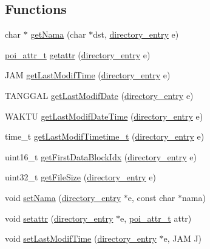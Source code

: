 \subsection*{Functions}
\begin{DoxyCompactItemize}
\item 
char $\ast$ \hyperlink{directory-entry_8c_a0a7b4158bec0f7e95ad6df41314397cd}{get\-Nama} (char $\ast$dst, \hyperlink{structdirectory__entry}{directory\-\_\-entry} e)
\item 
\hyperlink{structpoi__attr__t}{poi\-\_\-attr\-\_\-t} \hyperlink{directory-entry_8c_a227f567ee0e8d9841e899f0dec64d678}{getattr} (\hyperlink{structdirectory__entry}{directory\-\_\-entry} e)
\item 
J\-A\-M \hyperlink{directory-entry_8c_aefc5e5fefc3001fa03539165440f4720}{get\-Last\-Modif\-Time} (\hyperlink{structdirectory__entry}{directory\-\_\-entry} e)
\item 
T\-A\-N\-G\-G\-A\-L \hyperlink{directory-entry_8c_a40cef09c0fc8f91e59441578582e0b8e}{get\-Last\-Modif\-Date} (\hyperlink{structdirectory__entry}{directory\-\_\-entry} e)
\item 
W\-A\-K\-T\-U \hyperlink{directory-entry_8c_a470a6bf272a569acfa071474105e2317}{get\-Last\-Modif\-Date\-Time} (\hyperlink{structdirectory__entry}{directory\-\_\-entry} e)
\item 
time\-\_\-t \hyperlink{directory-entry_8c_ac5adead83b794823faf9472d68a6ce23}{get\-Last\-Modif\-Timetime\-\_\-t} (\hyperlink{structdirectory__entry}{directory\-\_\-entry} e)
\item 
uint16\-\_\-t \hyperlink{directory-entry_8c_ae2d5c0b699d98670b2d768bc747ee9c3}{get\-First\-Data\-Block\-Idx} (\hyperlink{structdirectory__entry}{directory\-\_\-entry} e)
\item 
uint32\-\_\-t \hyperlink{directory-entry_8c_a21ccf64e7638d962dba75f7c4b62ab69}{get\-File\-Size} (\hyperlink{structdirectory__entry}{directory\-\_\-entry} e)
\item 
void \hyperlink{directory-entry_8c_aaf2d59e38899c1a88c878a113355e68e}{set\-Nama} (\hyperlink{structdirectory__entry}{directory\-\_\-entry} $\ast$e, const char $\ast$nama)
\item 
void \hyperlink{directory-entry_8c_ab707665b70d7b489fea00097a365302b}{setattr} (\hyperlink{structdirectory__entry}{directory\-\_\-entry} $\ast$e, \hyperlink{structpoi__attr__t}{poi\-\_\-attr\-\_\-t} attr)
\item 
void \hyperlink{directory-entry_8c_a0dbc96b3055551072fccce217082e16a}{set\-Last\-Modif\-Time} (\hyperlink{structdirectory__entry}{directory\-\_\-entry} $\ast$e, J\-A\-M J)

\end{DoxyCompactItemize}
